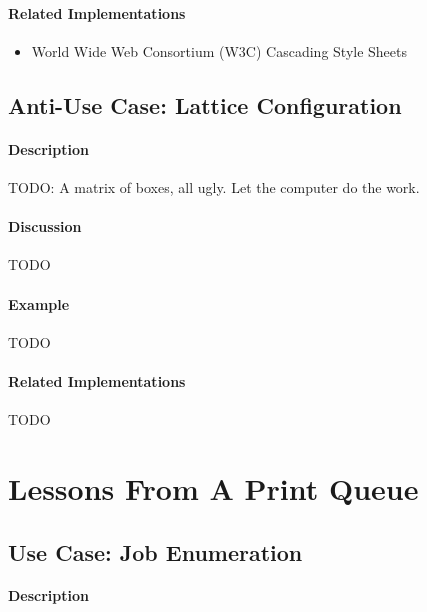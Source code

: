 \paragraph{Related Implementations}

\begin{itemize}
	\item World Wide Web Consortium (W3C) Cascading Style Sheets
\end{itemize}

\subsection{Anti-Use Case: Lattice Configuration}

\paragraph{Description}

{\Large TODO:} A matrix of boxes, all ugly.  Let the computer do the work.

\paragraph{Discussion}

{\Large TODO}

\paragraph{Example}

{\Large TODO}

\paragraph{Related Implementations}

{\Large TODO}

\section{Lessons From A Print Queue}

\subsection{Use Case: Job Enumeration}

\paragraph{Description}

